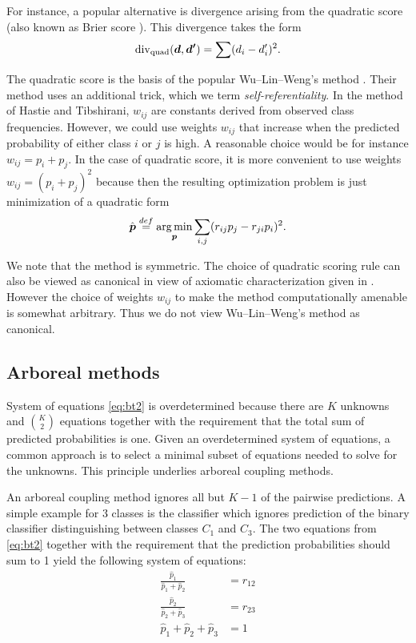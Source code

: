 For instance, a popular alternative is divergence arising from the quadratic  score \cite{gneiting2007strictly} (also known as Brier score \cite{brier1950verification}). This divergence takes the form
$$
\operatorname*{div}\nolimits_\textrm{quad} (\boldsymbol{d}, \boldsymbol{d'})= \sum (d_i - d'_i)^2.
$$

The quadratic score is the basis of the popular Wu--Lin--Weng's method \cite{wu2004probability}. 
Their method uses an additional trick, which we term \emph{self-referentiality}. In the method of Hastie and Tibshirani, $w_{ij}$ are constants derived from observed class frequencies. However, we could use weights $w_{ij}$ that increase when the predicted probability of either class $i$ or $j$ is high. A reasonable choice would be for instance $w_{ij}= p_i + p_j$. In the case of quadratic score, it is more convenient to use weights $w_{ij} = (p_i + p_j)^2$ because then the resulting optimization problem is just minimization of a quadratic form
\begin{align*}
\hat{\boldsymbol{p}} \stackrel{def}{=} \operatorname*{arg\,min}_{\boldsymbol{p}} \sum_{i,j} (r_{ij}p_j - r_{ji}p_i)^2.
\end{align*}

We note that the method is symmetric. The choice of quadratic scoring rule can also be viewed as canonical in view of axiomatic characterization given in  \cite{selten1998axiomatic}.  However the choice of weights $w_{ij}$ to make the method computationally amenable is somewhat arbitrary. Thus we do not view Wu--Lin--Weng's method as canonical.

\subsection{Arboreal methods}

System of equations \eqref{eq:bt2} is overdetermined because there are $K$ unknowns and $\binom{K}{2}$ equations together with the requirement that the total sum of predicted probabilities is one.  Given an overdetermined system of equations, a common approach is to select a minimal subset of equations needed to solve for the unknowns. This principle underlies arboreal coupling methods.

An arboreal coupling method ignores all but $K-1$ of the pairwise predictions. A simple example for 3 classes is the classifier which ignores prediction of the binary classifier distinguishing between classes $C_1$ and $C_3$. The two equations from \eqref{eq:bt2} together with the requirement that the prediction probabilities should sum to 1 yield the following system of equations:
\begin{equation}
	\begin{split}
		\frac{\hat p_1}{\hat p_1 + \hat p_2} &= {r}_{12}\\
		\frac{\hat p_2}{\hat p_2 + \hat p_3} &= {r}_{23}\\
		\hat p_1 + \hat p_2 + \hat p_3 &= 1
	\end{split}
	\label{eq:arb1}
\end{equation}

